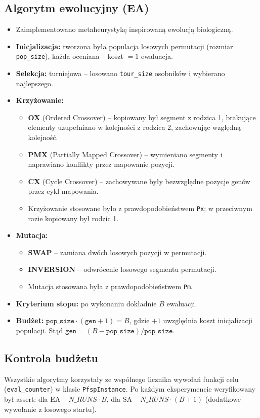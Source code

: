 \documentclass[11pt,a4paper]{article}
\begin{document}
\subsection{Algorytm ewolucyjny (EA)}
\label{sec:ea}
\begin{itemize}
    \item Zaimplementowano metaheurystykę inspirowaną ewolucją biologiczną.
    \item \textbf{Inicjalizacja:} tworzona była populacja losowych permutacji (rozmiar \texttt{pop\_size}), każda oceniana -- koszt $= 1$ ewaluacja.
    \item \textbf{Selekcja:} turniejowa -- losowano \texttt{tour\_size} osobników i wybierano najlepszego.
    \item \textbf{Krzyżowanie:}
    \begin{itemize}
        \item \textbf{OX} (Ordered Crossover) -- kopiowany był segment z rodzica 1, brakujące elementy uzupełniano w kolejności z rodzica 2, zachowując względną kolejność.
        \item \textbf{PMX} (Partially Mapped Crossover) -- wymieniano segmenty i naprawiano konflikty przez mapowanie pozycji.
        \item \textbf{CX} (Cycle Crossover) -- zachowywane były bezwzględne pozycje genów przez cykl mapowania.
        \item Krzyżowanie stosowane było z prawdopodobieństwem \texttt{Px}; w przeciwnym razie kopiowany był rodzic 1.
    \end{itemize}
    \item \textbf{Mutacja:}
    \begin{itemize}
        \item \textbf{SWAP} -- zamiana dwóch losowych pozycji w permutacji.
        \item \textbf{INVERSION} -- odwrócenie losowego segmentu permutacji.
        \item Mutacja stosowana była z prawdopodobieństwem \texttt{Pm}.
    \end{itemize}
    \item \textbf{Kryterium stopu:} po wykonaniu dokładnie $B$ ewaluacji.
    \item \textbf{Budżet:} $\texttt{pop\_size} \cdot (\texttt{gen} + 1) = B$, gdzie $+1$ uwzględnia koszt inicjalizacji populacji. Stąd $\texttt{gen} = (B - \texttt{pop\_size}) / \texttt{pop\_size}$.
\end{itemize}

\subsection{Kontrola budżetu}
Wszystkie algorytmy korzystały ze wspólnego licznika wywołań funkcji celu (\texttt{eval\_counter}) w klasie \texttt{PfspInstance}. Po każdym eksperymencie weryfikowany był assert: dla EA -- $N\_RUNS \cdot B$, dla SA -- $N\_RUNS \cdot (B+1)$ (dodatkowe wywołanie z losowego startu).
\end{document}
